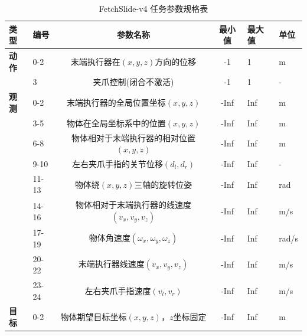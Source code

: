 \begin{table}[!htb]
  \caption{FetchSlide-v4 任务参数规格表}\label{tab:fetch-slide-full}
  \centering
  \small
  \begin{tabular}{@{} llccll @{}} \toprule
    \textbf{类型} & \textbf{编号} & \textbf{参数名称} & \textbf{最小值} & \textbf{最大值} & \textbf{单位} \\ \midrule
    \textbf{动作} & 0-2 & 末端执行器在$(x, y, z)$方向的位移 & -1 & 1 & m \\
    & 3 & 夹爪控制(闭合不激活) & -1 & 1 & - \\ \midrule
    \textbf{观测} & 0-2 & 末端执行器的全局位置坐标$(x, y, z)$ & -Inf & Inf & m \\
    & 3-5 & 物体在全局坐标系中的位置$(x, y, z)$ & -Inf & Inf & m \\
    & 6-8 & 物体相对于末端执行器的相对位置$(x, y, z)$ & -Inf & Inf & m \\
    & 9-10 & 左右夹爪手指的关节位移$(d_l, d_r)$ & -Inf & Inf & - \\
    & 11-13 & 物体绕$(x, y, z)$三轴的旋转位姿 & -Inf & Inf & rad \\
    & 14-16 & 物体相对于末端执行器的线速度$(v_x, v_y, v_z)$ & -Inf & Inf & m/s \\
    & 17-19 & 物体角速度$(\omega_x, \omega_y, \omega_z)$ & -Inf & Inf & rad/s \\
    & 20-22 & 末端执行器线速度$(v_x, v_y, v_z)$ & -Inf & Inf & m/s \\
    & 23-24 & 左右夹爪手指速度$(v_{l}, v_{r})$  & -Inf & Inf & m/s \\ \midrule
    \textbf{目标} & 0-2 & 物体期望目标坐标$(x, y, z)$，$z$坐标固定 & -Inf & Inf & m \\ \bottomrule
  \end{tabular}
\end{table}

